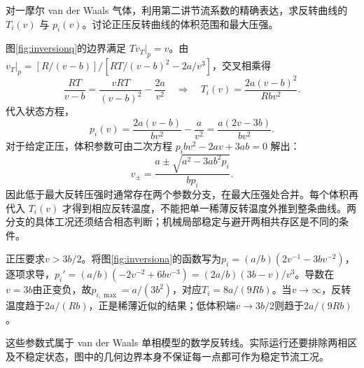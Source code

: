 \begin{example}[节流反转曲线的完整参数形式]
对一摩尔 van der Waals 气体，利用第二讲节流系数的精确表达，求反转曲线的 $T_i(v)$ 与 $p_i(v)$。讨论正压反转曲线的体积范围和最大压强。
\end{example}
\begin{solution}
图\ref{fig:inversionq}的边界满足 $Tv_T|_p=v$。由 $v_T|_p=[R/(v-b)]/[RT/(v-b)^2-2a/v^3]$，交叉相乘得
\[
 \frac{RT}{v-b}=\frac{vRT}{(v-b)^2}-\frac{2a}{v^2}
 \quad\Rightarrow\quad
 T_i(v)=\frac{2a(v-b)^2}{Rb v^2}.
\]
代入状态方程，
\[
 p_i(v)=\frac{2a(v-b)}{bv^2}-\frac a{v^2}
 =\frac{a(2v-3b)}{bv^2}.
\]
对于给定正压，体积参数可由二次方程 $p_ibv^2-2av+3ab=0$ 解出：
\[
 v_\pm=\frac{a\pm\sqrt{a^2-3ab^2p_i}}{bp_i}.
\]
因此低于最大反转压强时通常存在两个参数分支，在最大压强处合并。每个体积再代入 $T_i(v)$ 才得到相应反转温度，不能把单一稀薄反转温度外推到整条曲线。两分支的具体工况还须结合相态判断；机械局部稳定与避开两相共存区是不同的条件。

正压要求$v>3b/2$。将图\ref{fig:inversiona}的函数写为$p_i=(a/b)(2v^{-1}-3bv^{-2})$，逐项求导，$p_i'=(a/b)(-2v^{-2}+6bv^{-3})=(2a/b)(3b-v)/v^3$。导数在$v=3b$由正变负，故$p_{i,\max}=a/(3b^2)$，对应$T_i=8a/(9Rb)$。当$v\to\infty$，反转温度趋于$2a/(Rb)$，正是稀薄近似的结果；低体积端$v\to3b/2$则趋于$2a/(9Rb)$。

这些参数式属于 van der Waals 单相模型的数学反转线。实际运行还要排除两相区及不稳定状态，图中的几何边界本身不保证每一点都可作为稳定节流工况。
\end{solution}

